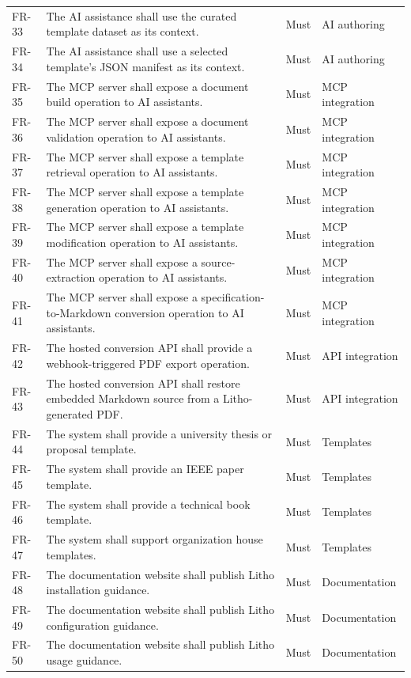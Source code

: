 \begin{xltabular}{\textwidth}{@{}p{0.12\textwidth}X p{0.15\textwidth}p{0.20\textwidth}@{}}
FR-33 & The AI assistance shall use the curated template dataset as its context. & Must & AI authoring \\
FR-34 & The AI assistance shall use a selected template's JSON manifest as its context. & Must & AI authoring \\
FR-35 & The MCP server shall expose a document build operation to AI assistants. & Must & MCP integration \\
FR-36 & The MCP server shall expose a document validation operation to AI assistants. & Must & MCP integration \\
FR-37 & The MCP server shall expose a template retrieval operation to AI assistants. & Must & MCP integration \\
FR-38 & The MCP server shall expose a template generation operation to AI assistants. & Must & MCP integration \\
FR-39 & The MCP server shall expose a template modification operation to AI assistants. & Must & MCP integration \\
FR-40 & The MCP server shall expose a source-extraction operation to AI assistants. & Must & MCP integration \\
FR-41 & The MCP server shall expose a specification-to-Markdown conversion operation to AI assistants. & Must & MCP integration \\
FR-42 & The hosted conversion API shall provide a webhook-triggered PDF export operation. & Must & API integration \\
FR-43 & The hosted conversion API shall restore embedded Markdown source from a Litho-generated PDF. & Must & API integration \\
FR-44 & The system shall provide a university thesis or proposal template. & Must & Templates \\
FR-45 & The system shall provide an IEEE paper template. & Must & Templates \\
FR-46 & The system shall provide a technical book template. & Must & Templates \\
FR-47 & The system shall support organization house templates. & Must & Templates \\
FR-48 & The documentation website shall publish Litho installation guidance. & Must & Documentation \\
FR-49 & The documentation website shall publish Litho configuration guidance. & Must & Documentation \\
FR-50 & The documentation website shall publish Litho usage guidance. & Must & Documentation \\

\end{xltabular}
